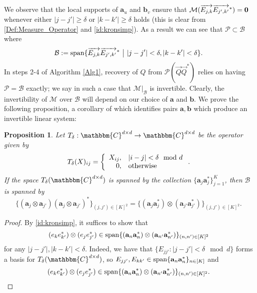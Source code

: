 \documentclass[]{spie}  %
\newtheorem{prop}{Proposition}
\def \vec{\overrightarrow}
\def \a {\mathbf a}
\def \b {\mathbf b}
\def \C {\mathbbm{C}}
\def \M {\mathcal{M}}
\def \P {\mathcal{P}}
\def \B {\mathcal{B}}
\def \Span {{\rm span}}
\begin{document}
We observe that the local supports of $\a_u$ and $\b_v$ ensure that $\mathcal{M}( \vec{E_{j,k}} \vec{E_{j',k'}}^*) = {\bf 0}$ whenever either $|j - j'| \geq \delta$ or $|k - k'| \geq \delta$ holds (this is clear from \eqref{Def:Measure_Operator} and \eqref{id:kronsimp}).  As a result we can see that $\P \subset \B$ where \begin{equation} \B := \Span\{ \vec{E_{j,k}} \vec{E_{j',k'}}^* ~{\bf \big |}~  |j - j'| < \delta, |k - k'| < \delta \}. \label{eq:B}\end{equation}  %
In steps 2-4 of Algorithm \ref{Alg1}, recovery of $Q$ from $\P(\vec{Q} \vec{Q}^*)$ relies on having $\P = \B$ exactly; we say in such a case that $\M|_\B$ is invertible.  Clearly, the invertibility of $\M$ over $\B$ will depend on our choice of $\a$ and $\b$.  We prove the following proposition, a corollary of which identifies pairs $\a, \b$ which produce an invertible linear system:
\begin{prop}
  Let $T_\delta : \C^{d \times d} \to \C^{d \times d}$ be the operator given by $$T_\delta(X)_{ij} = \left\{\begin{array}{r@{,\quad}l}
  X_{ij} & |i - j| < \delta \mod d \\
  0 & \text{otherwise}\end{array}\right..$$
  If the space $T_{\delta}(\C^{d \times d})$ is spanned by the collection $\{\a_j \a_j^*\}_{j=1}^K$, then $\B$ is spanned by $$\{(\a_j \otimes \a_{j'}) (\a_j \otimes \a_{j'})^*\}_{(j, j') \in [K]^2} = \{(\a_j \a_j^*) \otimes (\a_{j'} \a_{j'}^*)\}_{(j, j') \in [K]^2}.$$
  \label{prop:kronspan}
\end{prop}
%
\begin{proof}
  By \eqref{id:kronsimp}, it suffices to show that $$(e_k e_{k'}^*) \otimes (e_j e_{j'}^*) \in \Span\{(\a_n \a_n^*) \otimes (\a_{n'} \a_{n'}^*)\}_{(n, n') \in [K]^2}$$ for any $|j - j'|, |k - k'| < \delta$.  Indeed, we have that $\{E_{jj'} : |j - j'| < \delta \mod d\}$ forms a basis for $T_\delta(\C^{d \times d})$, so $E_{j j'}, E_{k k'} \in \Span\{\a_n \a_n^*\}_{n \in [K]}$ and $$(e_k e_{k'}^*) \otimes (e_j e_{j'}^*) \in \Span\{(\a_n \a_n^*) \otimes (\a_{n'} \a_{n'}^*)\}_{(n, n') \in [K]^2}.$$
\end{proof}
\end{document}

